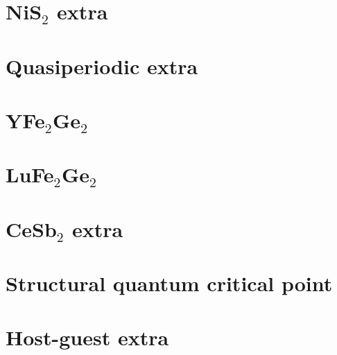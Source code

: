 \appendix

\section{NiS$_2$ extra}


\section{Quasiperiodic extra}


%
%



\section{YFe$_2$Ge$_2$}


\section{LuFe$_2$Ge$_2$}

% 

% 
\section{CeSb$_2$ extra}


\section{Structural quantum critical point}



\section{Host-guest extra}




% 


% 
% 

% 


% 


% 




